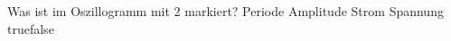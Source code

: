     {Was ist im Oszillogramm mit 2 markiert?}
    {Periode}
    {Amplitude}
    {Strom}
    {Spannung}
    {true}{false}
